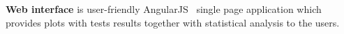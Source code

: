 \textbf{Web interface} is user-friendly AngularJS~\cite{AngularJS} single page application which provides plots with tests results together with statistical analysis to the users.








